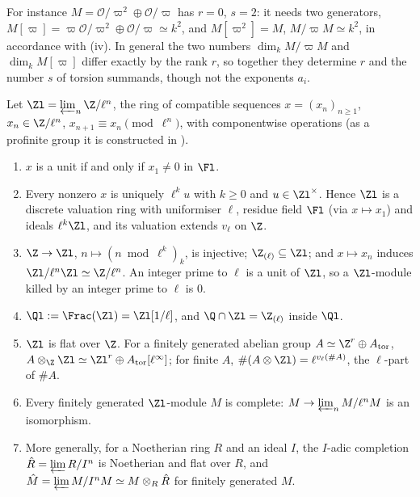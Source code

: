 For instance $M=\mathcal O/\varpi^2\oplus\mathcal O/\varpi$ has $r=0$, $s=2$: it needs two generators, $M[\varpi]=\varpi\mathcal O/\varpi^2\oplus\mathcal O/\varpi\simeq k^2$,
and $M[\varpi^2]=M$, $M/\varpi M\simeq k^2$, in accordance with (iv). In general the two numbers $\dim_kM/\varpi M$ and $\dim_kM[\varpi]$ differ exactly by the
rank $r$, so together they determine $r$ and the number $s$ of torsion summands, though not the exponents $a_i$.

\begin{theorem}\label{thm:modules:zl}
Let $\Zl=\varprojlim_n\Z/\ell^n$, the ring of compatible sequences $x=(x_n)_{n\ge1}$, $x_n\in\Z/\ell^n$, $x_{n+1}\equiv x_n\pmod{\ell^n}$, with
componentwise operations (as a profinite group it is constructed in ).
\begin{enumerate}[label=(\roman*)]
\item $x$ is a unit if and only if $x_1\ne0$ in $\Fl$.
\item Every nonzero $x$ is uniquely $\ell^ku$ with $k\ge0$ and $u\in\Zl^\times$. Hence $\Zl$ is a discrete valuation ring with uniformiser $\ell$,
residue field $\Fl$ (via $x\mapsto x_1$) and ideals $\ell^k\Zl$, and its valuation extends $v_\ell$ on $\Z$.
\item $\Z\to\Zl$, $n\mapsto(n\bmod\ell^k)_k$, is injective; $\Z_{(\ell)}\subseteq\Zl$; and $x\mapsto x_n$ induces $\Zl/\ell^n\Zl\simeq\Z/\ell^n$. An integer prime to
$\ell$ is a unit of $\Zl$, so a $\Zl$-module killed by an integer prime to $\ell$ is $0$.
\item $\Ql:=\Frac(\Zl)=\Zl[1/\ell]$, and $\Q\cap\Zl=\Z_{(\ell)}$ inside $\Ql$.
\item $\Zl$ is flat over $\Z$. For a finitely generated abelian group $A\simeq\Z^r\oplus A_{\mathrm{tor}}$, $A\otimes_\Z\Zl\simeq\Zl^r\oplus A_{\mathrm{tor}}[\ell^\infty]$; for finite
$A$, $\#(A\otimes\Zl)=\ell^{v_\ell(\#A)}$, the $\ell$-part of $\#A$.
\item Every finitely generated $\Zl$-module $M$ is complete: $M\to\varprojlim_nM/\ell^nM$ is an isomorphism.
\item More generally, for a Noetherian ring $R$ and an ideal $I$, the $I$-adic completion $\hat R=\varprojlim R/I^n$ is Noetherian and
flat over $R$, and $\hat M=\varprojlim M/I^nM\simeq M\otimes_R\hat R$ for finitely generated $M$.
\end{enumerate}
\end{theorem}

